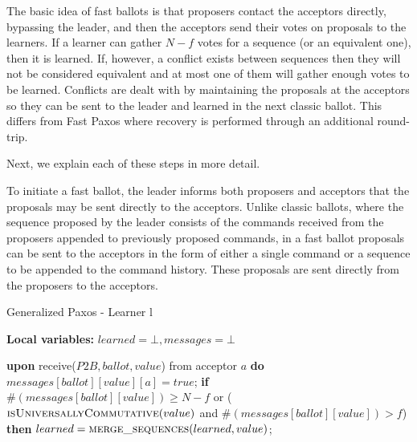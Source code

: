 The basic idea of fast ballots is that proposers contact the acceptors directly, bypassing the leader, and then the acceptors send their votes on proposals to the learners. If a learner can gather $N-f$ votes for a sequence (or an equivalent one), then it is learned. If, however, a conflict exists between sequences then they will not be considered equivalent and at most one of them will gather enough votes to be learned. Conflicts are dealt with by maintaining the proposals at the acceptors so they can be sent to the leader and learned in the next classic ballot. This differs from Fast Paxos where recovery is performed through an additional round-trip. \par
Next, we explain each of these steps in more detail.\par
{}
To initiate a fast ballot, the leader informs both proposers and acceptors that the proposals may be sent directly to the acceptors. Unlike classic ballots, where the sequence proposed by the leader consists of the commands received from the proposers appended to previously proposed commands, in a fast ballot proposals can be sent to the acceptors in the form of either a single command or a sequence to be appended to the command history. These proposals are sent directly from the proposers to the acceptors.\par

\begin{algorithm}
	\caption{Generalized Paxos - Learner l}
	\textbf{Local variables: } $learned = \bot, messages = \bot$ 
	\begin{algorithmic}[1]
		\State \textbf{upon} receive($P2B, ballot, value$) from acceptor $a$ \textbf{do}
		\State \hspace{\algorithmicindent} $messages[ballot][value][a] = true$;
		\State \hspace{\algorithmicindent} \textbf{if} $\#(messages[ballot][value]) \geq N-f$ or ($\Call{isUniversallyCommutative}{value}$ and $\#(messages[ballot][value]) > f$) \textbf{then}
		\State \hspace{\algorithmicindent} \hspace{\algorithmicindent} $learned = \Call{merge\_sequences}{learned, value}$;
	\end{algorithmic}
\end{algorithm}


